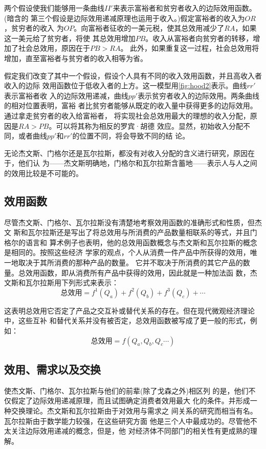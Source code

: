 两个假设使我们能够用一条曲线$II'$来表示富裕者和贫穷者收入的边际效用函数。(暗含的
第三个假设是边际效用递减原理也运用于收入。)假定富裕者的收入为$OR$，贫穷者的收入
为$OP$。向富裕者征收的一美元税，使其总效用减少了$RA$，如果这一美元给了贫穷者，将使
其总效用增加$PB$。收入从富裕者向贫穷者的转移，增加了社会总效用，原因在于$PB>RA$。
此外，如果重复这一过程，社会总效用将增加，直至富裕者与贫穷者的收入相等为省。

假定我们改变了其中一个假设，假设个人具有不同的收入效用函数，并且高收入者收入的边际
效用函数位于低收入者的上方。这一模型用\cref{fig:hood2}表示。曲线$rr'$表示富裕者收
入的边际效用递减，曲线$pp'$表示贫穷者收入的边际效用。两条曲线的相对位置表明，富裕
者比贫穷者能够从既定的收入量中获得更多的边际效用。通过拿走贫穷者的收入给富裕者，
将实现社会总效用最大的理想的收入分配，原因是$RA>PB$。可以将其称为相反的罗宾·胡德
效应。显然，初始收入分配不同，或者曲线$pp'和rr'$的位置不同，将会导致不同的结
论。

无论杰文斯、门格尔还是瓦尔拉斯，都没有对收入分配的含义进行研究，原因在于，他们认
为——杰文斯明确地，门格尔和瓦尔拉斯含蓄地——表示人与人之间的效用比较是不可能的。

\subsection{效用函数}

尽管杰文斯、门格尔、瓦尔拉斯没有清楚地考察效用函数的准确形式和性质，但杰文
斯和瓦尔拉斯还是写出了将总效用与所消费的产品数量相联系的等式，并且门格尔的语言和
算术例子也表明，他的总效用函数概念与杰文斯和瓦尔拉斯的概念是相同的。按照这些经济
学家的观点，个人从消费一件产品中所获得的效用，唯一地取决于其所消费的那种产品的数量。
它并不取决于所消费的其它产品的数量。总效用函数，即从消费所有产品中获得的效用，因此就是一种加法函
数，杰文斯和瓦尔拉斯用下列形式来表示：
\[总效用=f^1(Q_a)+f^2(Q_b)+f^3(Q_c)+ \cdots\]

这表明总效用它否定了产品之交互补或替代关系的存在。但在现代微观经济理论中，这些互补
和替代关系并没有被否定，总效用函数被写成了更一般的形式，例如：
\[总效用=f(Q_a,Q_b,Q_c\cdots)\]

\subsection{效用、需求以及交换}

使杰文斯、门格尔、瓦尔拉斯与他们的前辈(除了戈森之外)相区列
的是，他们不仅假定了边际效用递减原理，而且试图确定消费者效用最大
化的条件。并形成一种交换理论。杰文斯和瓦尔拉斯由于对效用与需求之
间关系的研究而相当有名。瓦尔拉斯由于数学能力较强，在这些研究方面
他是三个人中最成功的。尽管他不太关注边际效用递减的概念，但是，他
对经济体不同部门的相关性有更成熟的理解。


